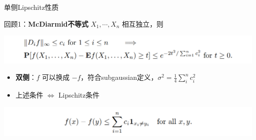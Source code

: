 \documentclass{beamer}
\begin{document}
\begin{frame}{单侧Lipschitz性质}

回顾1：\textbf{McDiarmid不等式} $X_1, \cdots, X_n$ 相互独立，则

\begin{center}
    \includegraphics[width=1.0\textwidth, frame]{figures/4-20-001.png}
\end{center}

\begin{itemize}
    \item \textbf{双侧}：$f$ 可以换成 $-f$，符合subgaussian定义，$\sigma^2=\frac{1}{4} \sum_i^n c_i^2$
    \item 上述条件 $\iff$ Lipschitz条件
\end{itemize}

\begin{center}
    \includegraphics[width=1.0\textwidth, frame]{figures/4-20-003.png}
\end{center}

\end{frame}
\end{document}
